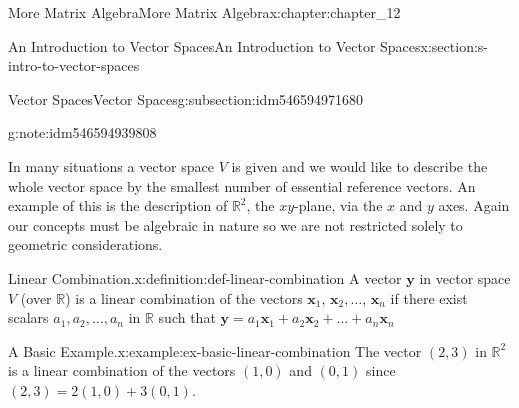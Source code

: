\documentclass[oneside,10pt,]{book}
\numberwithin{equation}{section}
\renewcommand{\vec}[1]{\mathbf{#1}}
\begin{document}
\begin{chapterptx}{More Matrix Algebra}{}{More Matrix Algebra}{}{}{x:chapter:chapter_12}
\begin{sectionptx}{An Introduction to Vector Spaces}{}{An Introduction to Vector Spaces}{}{}{x:section:s-intro-to-vector-spaces}
\begin{subsectionptx}{Vector Spaces}{}{Vector Spaces}{}{}{g:subsection:idm546594971680}
\begin{note}{}{g:note:idm546594939808}
\begin{enumerate}[label=(\arabic*)]
\end{enumerate}
%
\end{note}
In many situations a vector space \(V\) is given and we would like to describe the whole vector space by the smallest number of essential reference vectors. An example of this is the description of \(\mathbb{R}^2\), the \(x y\)-plane, via the \(x\) and \(y\) axes. Again our concepts must be algebraic in nature so we are not restricted solely to geometric considerations.%
\begin{definition}{Linear Combination.}{x:definition:def-linear-combination}%
%
\label{g:notation:idm546594925200}%
A vector \(\pmb{ y}\) in vector space \(V\) (over \(\mathbb{R}\)) is a linear combination of the vectors \(\vec{x}_1\), \(\vec{x}_2, \ldots\), \(\vec{x}_n\) if there exist scalars \(a_1,a_2,\ldots ,a_n\) in \(\mathbb{R}\) such that \(\vec{y}
= a_1\vec{x}_1+ a_2\vec{x}_2+\ldots +a_n\vec{x}_n\)%
\end{definition}
\begin{example}{A Basic Example.}{x:example:ex-basic-linear-combination}%
The vector \((2, 3)\) in \(\mathbb{R}^2\) is a linear combination of the vectors \((1, 0)\) and \((0, 1)\) since \((2, 3) =
2(1, 0) + 3(0, 1)\).%
\end{example}
\end{subsectionptx}
\end{sectionptx}
\end{chapterptx}
\end{document}

